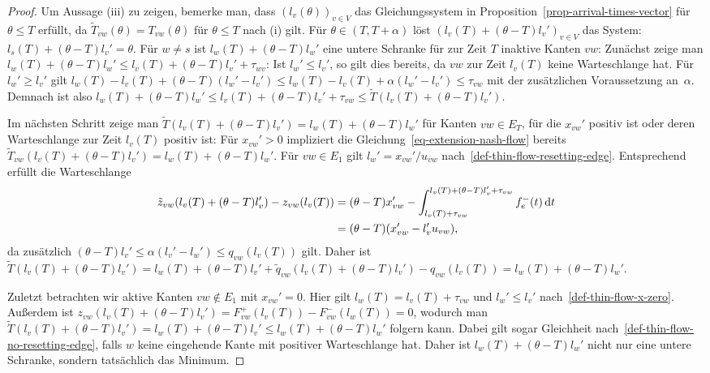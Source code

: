 \begin{proof}
	Um Aussage (iii) zu zeigen, bemerke man, dass $(l_v(\theta))_{v\in V}$ das Gleichungssystem in Proposition~\ref{prop-arrival-times-vector} für $\theta \leq T$ erfüllt, da $\tilde{T}_{vw}(\theta) = T_{vw}(\theta)$ für $\theta\leq T$ nach (i) gilt.
	Für $\theta \in (T, T+\alpha)$ löst $(l_v(T) + (\theta - T)l_v')_{v\in V}$  das System:
	 $l_s(T) + (\theta - T)l_v' = \theta$.
	Für $w\neq s$ ist $l_w(T) + (\theta - T) l_w'$ eine untere Schranke für zur Zeit $T$ inaktive Kanten $vw$:
	Zunächst zeige man $l_w(T) + (\theta - T)l_w' \leq l_v(T) + (\theta - T)l_v' + \tau_{wv}$:
	Ist $l_w' \leq l_v'$, so gilt dies bereits, da $vw$ zur Zeit $l_v(T)$ keine Warteschlange hat.
	Für $l_w' \geq l_v'$ gilt $l_w(T) - l_v(T) + (\theta - T) (l_w' - l_v') \leq l_w(T) - l_v(T) + \alpha (l_w' - l_v') \leq \tau_{vw}$ mit der zusätzlichen Voraussetzung an~$\alpha$.
	Demnach ist also $l_w(T) + (\theta - T) l_w' \leq l_v(T) + (\theta - T) l_v' + \tau_{vw} \leq \tilde{T}(l_v(T) + (\theta - T) l_v')$.
	
	Im nächsten Schritt zeige man $\tilde{T}(l_v(T) + (\theta - T)l_v') = l_w(T) + (\theta - T) l_w'$ für Kanten $vw\in E_T$, für die $x_{vw}'$ positiv ist oder deren Warteschlange zur Zeit $l_v(T)$ positiv ist:
	Für $x_{vw}' > 0$ impliziert die Gleichung~\ref{eq-extension-nash-flow} bereits $\tilde{T}_{vw}(l_v(T) + (\theta-T)l_v') = l_w(T) + (\theta - T) l_w'$.
	Für $vw\in E_1$ gilt $l_w' = x_{vw}' / u_{vw}$ nach~\ref{def-thin-flow-resetting-edge}.
	Entsprechend erfüllt die Warteschlange
	\begin{align*}
	\tilde{z}_{vw}(l_v(T) + (\theta - T)l_v') - z_{vw}(l_v(T)) &= (\theta - T) x_{vw}' - \int_{l_v(T) + \tau_{vw}}^{l_v(T) + (\theta - T) l_v' + \tau_{vw}} f_e^-(t) \mathop{}\!\mathrm{d} t \\
	&= (\theta - T) (x_{vw}' -l_v' u_{vw}),
	\end{align*}
	da zusätzlich $(\theta-T) l_v' \leq \alpha (l_v' - l_w') \leq q_{vw}(l_v(T))$ gilt.
	Daher ist $\tilde{T}(l_v(T) + (\theta - T)l_v') = l_w(T) + (\theta - T) l_v'  + \tilde{q}_{vw}(l_v(T) + (\theta - T)l_v')- q_{vw}(l_v(T)) = l_w(T) + (\theta - T) l_w'$.
	
	Zuletzt betrachten wir aktive Kanten $vw\notin E_1$ mit $x_{vw}' = 0$.
	Hier gilt $l_w(T) = l_v(T) + \tau_{vw}$ und $l_w' \leq l_v'$ nach~\ref{def-thin-flow-x-zero}.
	Außerdem ist $z_{vw}(l_v(T) + (\theta - T) l_v') = F_{vw}^+(l_v(T)) - F_{vw}^-(l_w(T)) = 0$, wodurch man $\tilde{T}(l_v(T) + (\theta - T) l_v') = l_w(T) + (\theta - T)l_v' \leq l_w(T) + (\theta - T) l_w'$ folgern kann.
	Dabei gilt sogar Gleichheit nach~\ref{def-thin-flow-no-resetting-edge}, falls $w$ keine eingehende Kante mit positiver Warteschlange hat.
	Daher ist $l_w(T)+(\theta - T) l_w'$ nicht nur eine untere Schranke, sondern tatsächlich das Minimum.
	

\end{proof}
